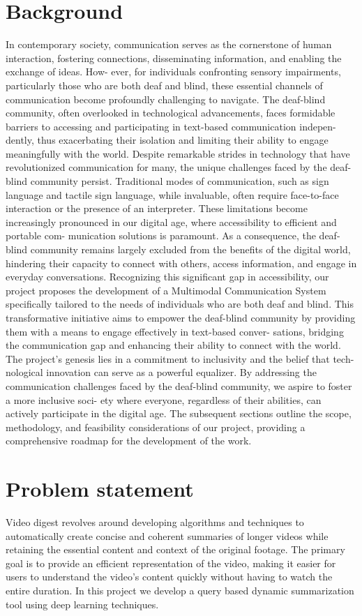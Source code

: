 \documentclass[12pt,a4paper]{report}
\begin{document}
\section{Background}
In contemporary society, communication serves as the cornerstone of human interaction,
fostering connections, disseminating information, and enabling the exchange of ideas. How-
ever, for individuals confronting sensory impairments, particularly those who are both deaf
and blind, these essential channels of communication become profoundly challenging to
navigate. The deaf-blind community, often overlooked in technological advancements, faces
formidable barriers to accessing and participating in text-based communication indepen-
dently, thus exacerbating their isolation and limiting their ability to engage meaningfully
with the world.
Despite remarkable strides in technology that have revolutionized communication for
many, the unique challenges faced by the deaf-blind community persist. Traditional modes
of communication, such as sign language and tactile sign language, while invaluable, often
require face-to-face interaction or the presence of an interpreter. These limitations become
increasingly pronounced in our digital age, where accessibility to efficient and portable com-
munication solutions is paramount. As a consequence, the deaf-blind community remains
largely excluded from the benefits of the digital world, hindering their capacity to connect
with others, access information, and engage in everyday conversations.
Recognizing this significant gap in accessibility, our project proposes the development of
a Multimodal Communication System specifically tailored to the needs of individuals who
are both deaf and blind. This transformative initiative aims to empower the deaf-blind
community by providing them with a means to engage effectively in text-based conver-
sations, bridging the communication gap and enhancing their ability to connect with the
world. The project’s genesis lies in a commitment to inclusivity and the belief that tech-
nological innovation can serve as a powerful equalizer. By addressing the communication
challenges faced by the deaf-blind community, we aspire to foster a more inclusive soci-
ety where everyone, regardless of their abilities, can actively participate in the digital age.
The subsequent sections outline the scope, methodology, and feasibility considerations of
our project, providing a comprehensive roadmap for the development of the work.

\section{Problem statement }
Video digest revolves around developing algorithms and techniques to automatically create concise and coherent summaries of longer videos while retaining the essential content and context of the original footage. The primary goal is to provide an efficient representation of the video, making it easier for users to understand the video's content quickly without having to watch the entire duration. In this project we develop a query based dynamic summarization tool using deep learning techniques. 
\end{document}
